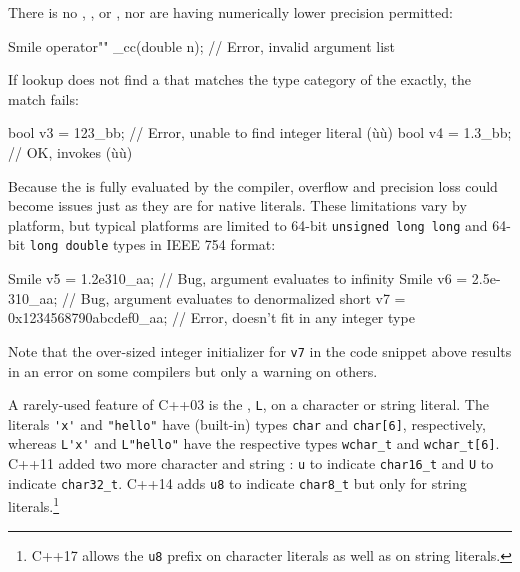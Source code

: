 \noindent There is no ,
, or
, nor are  having numerically lower precision permitted:

\begin{emcppslisting}
Smile operator"" _cc(double n);  // Error, invalid argument list
\end{emcppslisting}
    
\noindent If lookup does not find a  that matches the type
category of the  exactly, the match fails:

\begin{emcppslisting}
bool v3 = 123_bb;  // Error, unable to find integer literal (ù{}ù)
bool v4 = 1.3_bb;  // OK, invokes (ù{}ù)
\end{emcppslisting}
    
\noindent Because the  is fully evaluated by the compiler,
overflow and precision loss could become issues just as they are for
native literals. These limitations vary by platform, but typical
platforms are limited to 64-bit
\lstinline!unsigned!~\lstinline!long!~\lstinline!long! and 64-bit
\lstinline!long!~\lstinline!double! types in IEEE
754 format:

\begin{emcppslisting}
Smile v5 = 1.2e310_aa;              // Bug, argument evaluates to infinity
Smile v6 = 2.5e-310_aa;             // Bug, argument evaluates to denormalized
short v7 = 0x1234568790abcdef0_aa;  // Error, doesn't fit in any integer type
\end{emcppslisting}
    
\noindent Note that the over-sized integer initializer for \lstinline!v7! in the code snippet above
results in an error on some compilers but only a warning on others.

A rarely-used feature of C++03 is the ,
\lstinline!L!, on a character or string literal. The literals \lstinline!'x'!
and \lstinline!"hello"! have (built-in) types \lstinline!char! and
\lstinline!char[6]!, respectively, whereas \lstinline!L'x'! and
\lstinline!L"hello"! have the respective types \lstinline!wchar_t! and
\lstinline!wchar_t[6]!. C++11 added two more character and string
: \lstinline!u! to indicate \lstinline!char16_t!
and \lstinline!U! to indicate \lstinline!char32_t!. C++14 adds \lstinline!u8! to
indicate \lstinline!char8_t! but only for string
literals.{\cprotect\footnote{C++17 allows the \lstinline!u8! prefix on
  character literals as well as on string literals.}}

